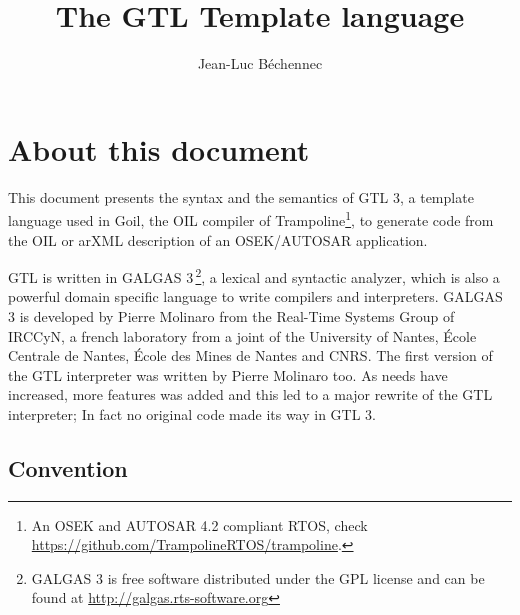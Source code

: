 \documentclass[10pt,openright,twosides,final]{memoir}
\title{The GTL Template language}
\author{Jean-Luc B\'echennec}
\begin{document}
\begin{titlingpage}
\end{titlingpage}


\tableofcontents

\chapter{About this document}

This document presents the syntax and the semantics of GTL 3, a template language used in Goil, the OIL compiler of Trampoline\footnote{An OSEK and AUTOSAR 4.2 compliant RTOS, check \url{https://github.com/TrampolineRTOS/trampoline}.}, to generate code from the OIL or arXML description of an OSEK/AUTOSAR application.

GTL is written in GALGAS 3\,\footnote{GALGAS 3 is free software distributed under the GPL license and can be found at \url{http://galgas.rts-software.org}}, a lexical and syntactic analyzer, which is also a powerful domain specific language to write compilers and interpreters. GALGAS 3 is developed by Pierre Molinaro from the Real-Time Systems Group of IRCCyN, a french laboratory from a joint of the University of Nantes, \'Ecole Centrale de Nantes, \'Ecole des Mines de Nantes and CNRS. The first version of the GTL interpreter was written by Pierre Molinaro too. As needs have increased, more features was added and this led to a major rewrite of the GTL interpreter; In fact no original code made its way in GTL 3.

\section*{Convention} 
\end{document}
